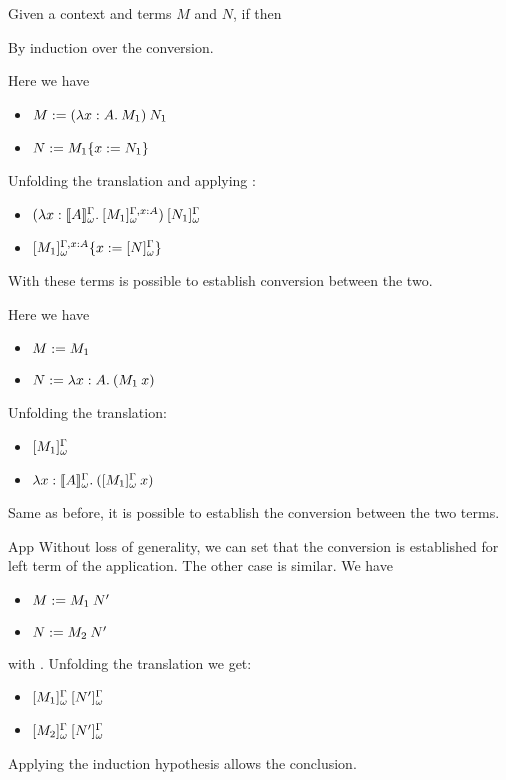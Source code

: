 \begin{Lemma}[Conversion]
\label{lemma:wtrans_conversion}
Given a context \Context{} and terms $M$ and $N$, if  then 
\end{Lemma}

\begin{Proof}
By induction over the conversion.
\begin{ProofCase}{\betaRed{}}
Here we have
\begin{itemize}
\item $M \termDef \app{(\abs{x}{A}{M_1})}{N_1}$
\item $N \termDef \subst{M_1}{x}{N_1}$
\end{itemize}
Unfolding the translation and applying :
\begin{itemize}
\item $\app{(\abs{x}{\WTypeTrans{A}}{
                    \WTrans[\typing{x}{A}]{M_1}})}{\WTrans{N_1}}$
\item $\subst{\WTrans[\typing{x}{A}]{M_1}}{x}{\WTrans{N}}$
\end{itemize}
With these terms is possible to establish conversion between the two.
\end{ProofCase}

\begin{ProofCase}{\etaExp{}}
Here we have
\begin{itemize}
\item $M := M_1$
\item $N \termDef \abs{x}{A}{(\app{M_1}{x})}$
\end{itemize}
Unfolding the translation:
\begin{itemize}
\item $\WTrans{M_1}$
\item $\abs{x}{\WTypeTrans{A}}{(\app{\WTrans{M_1}}{x})}$
\end{itemize}
Same as before, it is possible to establish the conversion between the two terms.
\end{ProofCase}

\begin{ProofCase}{App}
Without loss of generality, we can set that the conversion is established for 
left term of the application. The other case is similar. We have
\begin{itemize}
\item $M \termDef \app{M_1}{N'}$
\item $N \termDef \app{M_2}{N'}$
\end{itemize}
with . Unfolding the translation we get:
\begin{itemize}
\item $\app{\WTrans{M_1}}{\WTrans{N'}}$
\item $\app{\WTrans{M_2}}{\WTrans{N'}}$
\end{itemize}
Applying the induction hypothesis allows the conclusion.
\end{ProofCase}

\end{Proof}